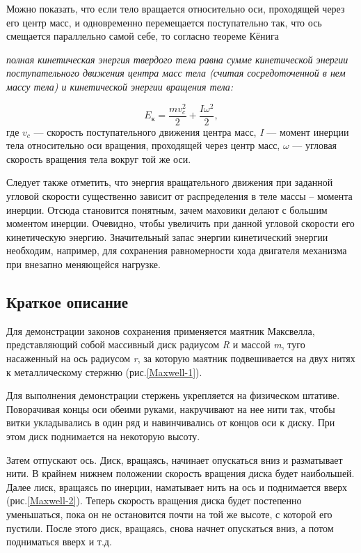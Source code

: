 \documentclass[All.tex]{subfiles}
\begin{document}
Можно показать, что если тело вращается относительно оси, проходящей через его центр масс, и одновременно перемещается поступательно так, что ось смещается параллельно самой себе, то согласно теореме Кёнига
\begin{flushleft}
\textit{полная кинетическая энергия твердого тела равна сумме кинетической энергии поступательного движения центра масс тела (считая сосредоточенной в нем массу тела) и кинетической энергии вращения тела:}
\end{flushleft}
$$ E_\text{к} = \frac{mv_c^2}{2} + \frac{I\omega^2}{2}, $$
где $ v_c $ — скорость поступательного движения центра масс, \textit{I} — момент инерции тела относительно оси вращения, проходящей через центр масс, $ \omega $ — угловая скорость вращения тела вокруг той же оси.

Следует также отметить, что энергия вращательного движения при заданной угловой скорости существенно зависит от распределения в теле массы – момента инерции.
Отсюда становится понятным, зачем маховики делают с большим моментом инерции.
Очевидно, чтобы увеличить при данной угловой скорости его кинетическую энергию.
Значительный запас энергии кинетический энергии необходим, например, для сохранения равномерности хода двигателя механизма при внезапно меняющейся нагрузке.
	
\subsection*{\textcolor{PineGreen}{Краткое описание}}


Для демонстрации законов сохранения применяется маятник Максвелла, представляющий собой массивный диск радиусом \textit{R} и массой \textit{m}, туго насаженный на ось радиусом \textit{r}, за которую маятник подвешивается на двух нитях к металлическому стержню (рис.\ref{Maxwell-1}).

Для выполнения демонстрации стержень укрепляется на физическом штативе.
Поворачивая концы оси обеими руками, накручивают на нее нити так, чтобы витки укладывались в один ряд и навинчивались от концов оси к диску.
При этом диск поднимается на некоторую высоту.

Затем отпускают ось.
Диск, вращаясь, начинает опускаться вниз и разматывает нити.
В крайнем нижнем положении скорость вращения диска будет наибольшей.
Далее лиск, вращаясь по инерции, наматывает нить на ось и поднимается вверх (рис.\ref{Maxwell-2}).
Теперь скорость вращения диска будет постепенно уменьшаться, пока он не остановится почти на той же высоте, с которой его пустили.
После этого диск, вращаясь, снова начнет опускаться вниз, а потом подниматься вверх и т.д.
\end{document}
